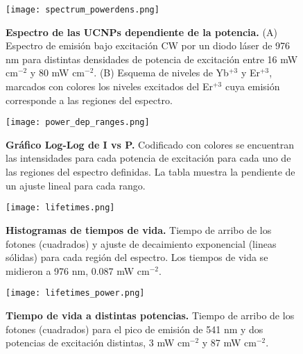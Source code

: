 \begin{figure}
    \centering
    \texttt{[image: spectrum\_powerdens.png]}
    \caption{\textbf{Espectro de las UCNPs dependiente de la potencia.} (A) Espectro de emisión bajo excitación CW por un diodo láser de 976 nm para distintas densidades de potencia de excitación entre 16 mW cm$^{-2}$ y 80 mW cm$^{-2}$.
    (B) Esquema de niveles de Yb$^{+3}$ y Er$^{+3}$, marcados con colores los niveles excitados del Er$^{+3}$ cuya emisión corresponde a las regiones del espectro.}
    \label{fig:power_dep_spectrum}
\end{figure}

\begin{figure}
    \centering
    \texttt{[image: power\_dep\_ranges.png]}
    \caption{\textbf{Gráfico Log-Log de I vs P.} Codificado con colores se encuentran las intensidades para cada potencia de excitación para cada uno de las regiones del espectro definidas. La tabla muestra la pendiente de un ajuste lineal para cada rango.}
    \label{fig:power_dep_ranges}
\end{figure}


\begin{SCfigure}
    \centering
    \texttt{[image: lifetimes.png]}
    \caption{\textbf{Histogramas de tiempos de vida.} Tiempo de arribo de los fotones (cuadrados) y ajuste de decaimiento exponencial (lineas sólidas) para cada región del espectro. Los tiempos de vida se midieron a 976 nm, 0.087 mW cm$^{-2}$.}
    \label{fig:lifetimes}
\end{SCfigure}

\begin{SCfigure}
    \centering
    \texttt{[image: lifetimes\_power.png]}
    \caption{\textbf{Tiempo de vida a distintas potencias.} Tiempo de arribo de los fotones (cuadrados) para el pico de emisión de 541 nm y dos potencias de excitación distintas, 3 mW cm$^{-2}$ y 87 mW cm$^{-2}$.}
    \label{fig:lifetimes_power}
\end{SCfigure}
